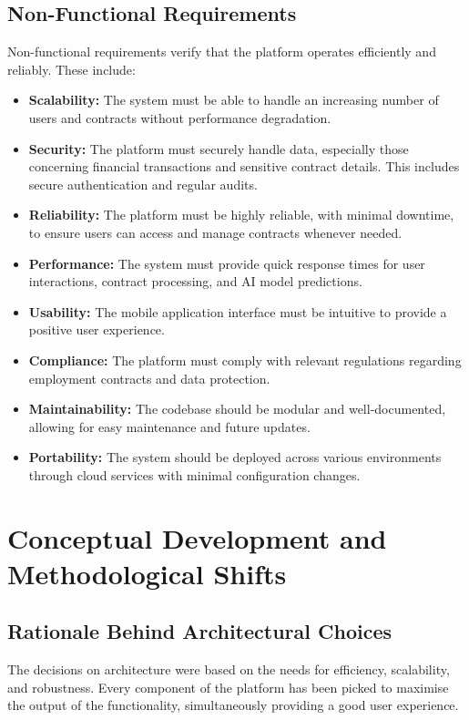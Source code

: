 \subsection{Non-Functional Requirements}

Non-functional requirements verify that the platform operates efficiently and reliably. These include:

\begin{itemize}
    \item \textbf{Scalability:} The system must be able to handle an increasing number of users and contracts without performance degradation.
    \item \textbf{Security:} The platform must securely handle data, especially those concerning financial transactions and sensitive contract details. This includes secure authentication and regular audits.
    \item \textbf{Reliability:} The platform must be highly reliable, with minimal downtime, to ensure users can access and manage contracts whenever needed.
    \item \textbf{Performance:} The system must provide quick response times for user interactions, contract processing, and AI model predictions.
    \item \textbf{Usability:} The mobile application interface must be intuitive to provide a positive user experience.
    \item \textbf{Compliance:} The platform must comply with relevant regulations regarding employment contracts and data protection.
    \item \textbf{Maintainability:} The codebase should be modular and well-documented, allowing for easy maintenance and future updates.
    \item \textbf{Portability:} The system should be deployed across various environments through cloud services with minimal configuration changes.
\end{itemize}

\section{Conceptual Development and Methodological Shifts}

\subsection{Rationale Behind Architectural Choices}

The decisions on architecture were based on the needs for efficiency, scalability, and robustness. Every component of the platform has been picked to maximise the output of the functionality, simultaneously providing a good user experience.

